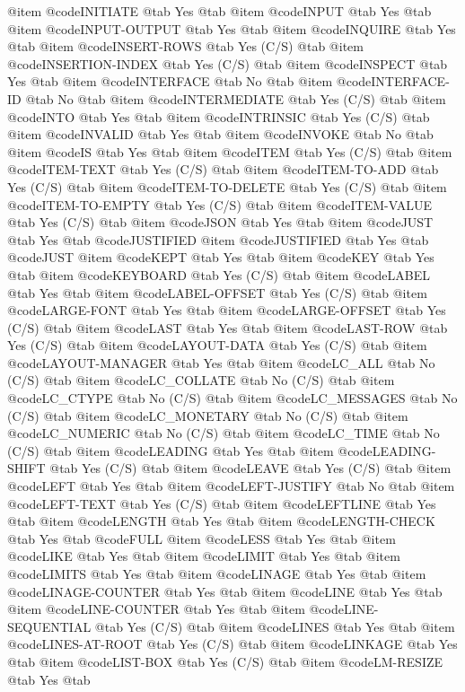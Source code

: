 @item @code{INITIATE} @tab Yes @tab 
@item @code{INPUT} @tab Yes @tab 
@item @code{INPUT-OUTPUT} @tab Yes @tab 
@item @code{INQUIRE} @tab Yes @tab 
@item @code{INSERT-ROWS} @tab Yes	(C/S) @tab 
@item @code{INSERTION-INDEX} @tab Yes	(C/S) @tab 
@item @code{INSPECT} @tab Yes @tab 
@item @code{INTERFACE} @tab No @tab 
@item @code{INTERFACE-ID} @tab No @tab 
@item @code{INTERMEDIATE} @tab Yes	(C/S) @tab 
@item @code{INTO} @tab Yes @tab 
@item @code{INTRINSIC} @tab Yes	(C/S) @tab 
@item @code{INVALID} @tab Yes @tab 
@item @code{INVOKE} @tab No @tab 
@item @code{IS} @tab Yes @tab 
@item @code{ITEM} @tab Yes	(C/S) @tab 
@item @code{ITEM-TEXT} @tab Yes	(C/S) @tab 
@item @code{ITEM-TO-ADD} @tab Yes	(C/S) @tab 
@item @code{ITEM-TO-DELETE} @tab Yes	(C/S) @tab 
@item @code{ITEM-TO-EMPTY} @tab Yes	(C/S) @tab 
@item @code{ITEM-VALUE} @tab Yes	(C/S) @tab 
@item @code{JSON} @tab Yes @tab 
@item @code{JUST} @tab Yes @tab @code{JUSTIFIED}
@item @code{JUSTIFIED} @tab Yes @tab @code{JUST}
@item @code{KEPT} @tab Yes @tab 
@item @code{KEY} @tab Yes @tab 
@item @code{KEYBOARD} @tab Yes	(C/S) @tab 
@item @code{LABEL} @tab Yes @tab 
@item @code{LABEL-OFFSET} @tab Yes	(C/S) @tab 
@item @code{LARGE-FONT} @tab Yes @tab 
@item @code{LARGE-OFFSET} @tab Yes	(C/S) @tab 
@item @code{LAST} @tab Yes @tab 
@item @code{LAST-ROW} @tab Yes	(C/S) @tab 
@item @code{LAYOUT-DATA} @tab Yes	(C/S) @tab 
@item @code{LAYOUT-MANAGER} @tab Yes @tab 
@item @code{LC_ALL} @tab No	(C/S) @tab 
@item @code{LC_COLLATE} @tab No	(C/S) @tab 
@item @code{LC_CTYPE} @tab No	(C/S) @tab 
@item @code{LC_MESSAGES} @tab No	(C/S) @tab 
@item @code{LC_MONETARY} @tab No	(C/S) @tab 
@item @code{LC_NUMERIC} @tab No	(C/S) @tab 
@item @code{LC_TIME} @tab No	(C/S) @tab 
@item @code{LEADING} @tab Yes @tab 
@item @code{LEADING-SHIFT} @tab Yes	(C/S) @tab 
@item @code{LEAVE} @tab Yes	(C/S) @tab 
@item @code{LEFT} @tab Yes @tab 
@item @code{LEFT-JUSTIFY} @tab No @tab 
@item @code{LEFT-TEXT} @tab Yes	(C/S) @tab 
@item @code{LEFTLINE} @tab Yes @tab 
@item @code{LENGTH} @tab Yes @tab 
@item @code{LENGTH-CHECK} @tab Yes @tab @code{FULL}
@item @code{LESS} @tab Yes @tab 
@item @code{LIKE} @tab Yes @tab 
@item @code{LIMIT} @tab Yes @tab 
@item @code{LIMITS} @tab Yes @tab 
@item @code{LINAGE} @tab Yes @tab 
@item @code{LINAGE-COUNTER} @tab Yes @tab 
@item @code{LINE} @tab Yes @tab 
@item @code{LINE-COUNTER} @tab Yes @tab 
@item @code{LINE-SEQUENTIAL} @tab Yes	(C/S) @tab 
@item @code{LINES} @tab Yes @tab 
@item @code{LINES-AT-ROOT} @tab Yes	(C/S) @tab 
@item @code{LINKAGE} @tab Yes @tab 
@item @code{LIST-BOX} @tab Yes	(C/S) @tab 
@item @code{LM-RESIZE} @tab Yes @tab 
